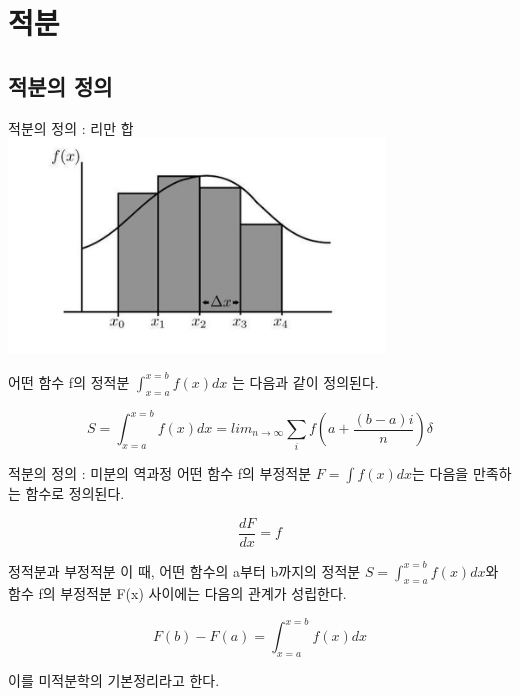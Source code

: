\documentclass{beamer}
\begin{document}
\section{적분} 

\subsection{적분의 정의} 

\begin{frame}{적분의 정의 : 리만 합} 
\includegraphics[width=10cm,keepaspectratio]{sum}

어떤 함수 f의 정적분 $\int^{x=b}_{x=a} f(x)dx$ 는 다음과 같이 정의된다. 

\begin{equation} 
S = \int^{x=b}_{x=a} f(x)dx = lim_{n \rightarrow \infty} \sum_i f(a + \frac{(b-a)i}{n}) \delta 
\end{equation} 


\end{frame}

\begin{frame}{적분의 정의 : 미분의 역과정} 
어떤 함수 f의 부정적분 $F=\int f(x)dx$는 다음을 만족하는 함수로 정의된다. 

\begin{equation} 
\frac{dF}{dx} = f
\end{equation}
\end{frame}


\begin{frame}{정적분과 부정적분} 
이 때, 어떤 함수의 a부터 b까지의 정적분 $S = \int^{x=b}_{x=a} f(x)dx$와 함수 f의 부정적분 F(x) 사이에는 다음의 관계가 성립한다. 

\begin{equation} 
F(b) - F(a) = \int^{x=b}_{x=a} f(x)dx
\end{equation} 

이를 미적분학의 기본정리라고 한다. 
\end{frame}
\end{document}
